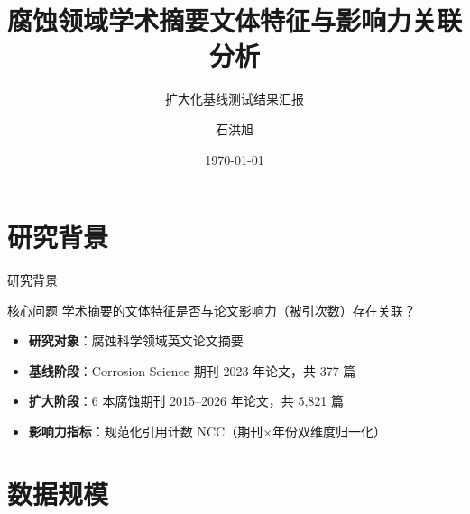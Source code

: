 \documentclass[10pt,aspectratio=169]{ctexbeamer}
\title{腐蚀领域学术摘要文体特征与影响力关联分析}
\subtitle{扩大化基线测试结果汇报}
\author{石洪旭}
\date{\today}
\institute{上海理工大学}
\begin{document}
\begin{frame}
\titlepage
\end{frame}

\section{研究背景}

\begin{frame}{研究背景}
  \begin{block}{核心问题}
    学术摘要的文体特征是否与论文影响力（被引次数）存在关联？
  \end{block}

  \begin{itemize}
    \item \textbf{研究对象}：腐蚀科学领域英文论文摘要
    \item \textbf{基线阶段}：Corrosion Science 期刊 2023 年论文，共 377 篇
    \item \textbf{扩大阶段}：6 本腐蚀期刊 2015--2026 年论文，共 5{,}821 篇
    \item \textbf{影响力指标}：规范化引用计数 NCC（期刊$\times$年份双维度归一化）
  \end{itemize}
\end{frame}

\section{数据规模}
\end{document}
